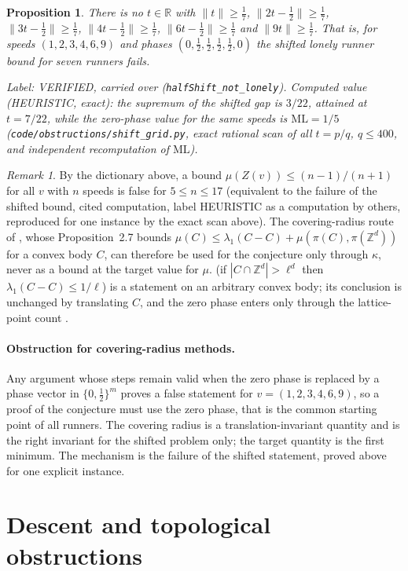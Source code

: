 \documentclass[11pt]{article}
\newtheorem{proposition}[theorem]{Proposition}
\theoremstyle{remark}
\newtheorem{remark}[theorem]{Remark}
\newcommand{\norm}[1]{\lVert #1\rVert}
\newcommand{\ML}{\mathrm{ML}}
\newcommand{\Z}{\mathbb{Z}}
\newcommand{\R}{\mathbb{R}}
\newcommand{\lab}[1]{\par\smallskip\noindent\textit{Label: #1.}}
\begin{document}
\begin{proposition}\label{prop:phase}
There is no $t\in\R$ with $\norm{t}\ge\frac17$, $\norm{2t-\frac12}\ge\frac17$, $\norm{3t-\frac12}\ge\frac17$, $\norm{4t-\frac12}\ge\frac17$, $\norm{6t-\frac12}\ge\frac17$ and $\norm{9t}\ge\frac17$. That is, for speeds $(1,2,3,4,6,9)$ and phases $(0,\frac12,\frac12,\frac12,\frac12,0)$ the shifted lonely runner bound for seven runners fails.
\end{proposition}
\lab{VERIFIED, carried over (\texttt{halfShift\_not\_lonely}). Computed value (HEURISTIC, exact): the supremum of the shifted gap is $3/22$, attained at $t=7/22$, while the zero-phase value for the same speeds is $\ML=1/5$ (\texttt{code/obstructions/shift\_grid.py}, exact rational scan of all $t=p/q$, $q\le 400$, and independent recomputation of $\ML$)}

\begin{remark}\label{rem:cr}
By the dictionary above, a bound $\mu(Z(v))\le (n-1)/(n+1)$ for all $v$ with $n$ speeds is false for $5\le n\le17$ (equivalent to the failure of the shifted bound, cited computation, label HEURISTIC as a computation by others, reproduced for one instance by the exact scan above). The covering-radius route of \cite{MSS25}, whose Proposition~2.7 bounds $\mu(C)\le\lambda_1(C-C)+\mu(\pi(C),\pi(\Z^d))$ for a convex body $C$, can therefore be used for the conjecture only through $\kappa$, never as a bound at the target value for $\mu$. \cite[Lemma~2.5]{MSS25} (if $|C\cap\Z^d|>\ell^d$ then $\lambda_1(C-C)\le1/\ell$) is a statement on an arbitrary convex body; its conclusion is unchanged by translating $C$, and the zero phase enters only through the lattice-point count \cite[Cor.~2.3]{MSS25}.
\end{remark}

\paragraph{Obstruction for covering-radius methods.} Any argument whose steps remain valid when the zero phase is replaced by a phase vector in $\{0,\frac12\}^m$ proves a false statement for $v=(1,2,3,4,6,9)$, so a proof of the conjecture must use the zero phase, that is the common starting point of all runners. The covering radius is a translation-invariant quantity and is the right invariant for the shifted problem only; the target quantity is the first minimum. The mechanism is the failure of the shifted statement, proved above for one explicit instance.

\section{Descent and topological obstructions}\label{sec:descent}
\end{document}
